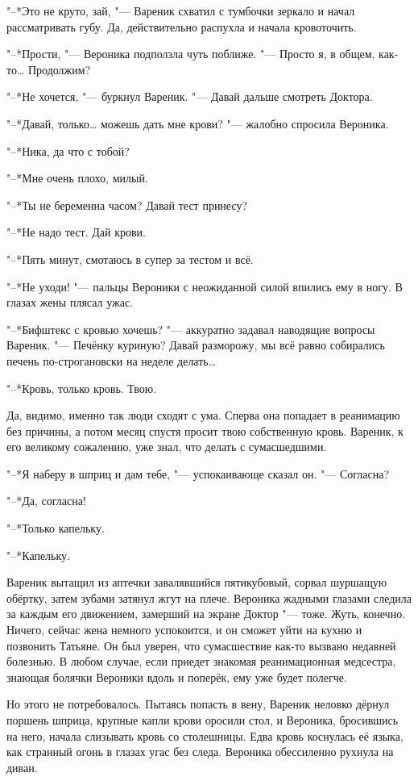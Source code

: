 "--*Это не круто, зай, "--- Вареник схватил с тумбочки зеркало и начал рассматривать губу.
Да, действительно распухла и начала кровоточить.

"--*Прости, "--- Вероника подползла чуть поближе.
"--- Просто я, в общем, как-то\dots{}
Продолжим?

"--*Не хочется, "--- буркнул Вареник.
"--- Давай дальше смотреть Доктора.

"--*Давай, только\dots{} можешь дать мне крови? "--- жалобно спросила Вероника.

"--*Ника, да что с тобой?

"--*Мне очень плохо, милый.

"--*Ты не беременна часом?
Давай тест принесу?

"--*Не надо тест.
Дай крови.

"--*Пять минут, смотаюсь в супер за тестом и всё.

"--*Не уходи! "--- пальцы Вероники с неожиданной силой впились ему в ногу.
В глазах жены плясал ужас.

"--*Бифштекс с кровью хочешь? "--- аккуратно задавал наводящие вопросы Вареник.
"--- Печёнку куриную?
Давай разморожу, мы всё равно собирались печень по-строгановски на неделе делать\dots{}

"--*Кровь, только кровь.
Твою.

Да, видимо, именно так люди сходят с ума.
Сперва она попадает в реанимацию без причины, а потом месяц спустя просит твою собственную кровь.
Вареник, к его великому сожалению, уже знал, что делать с сумасшедшими.

"--*Я наберу в шприц и дам тебе, "--- успокаивающе сказал он.
"--- Согласна?

"--*Да, согласна!

"--*Только капельку.

"--*Капельку.

Вареник вытащил из аптечки завалявшийся пятикубовый, сорвал шуршащую обёртку, затем зубами затянул жгут на плече.
Вероника жадными глазами следила за каждым его движением, замерший на экране Доктор "--- тоже.
Жуть, конечно.
Ничего, сейчас жена немного успокоится, и он сможет уйти на кухню и позвонить Татьяне.
Он был уверен, что сумасшествие как-то вызвано недавней болезнью.
В любом случае, если приедет знакомая реанимационная медсестра, знающая болячки Вероники вдоль и поперёк, ему уже будет полегче.

Но этого не потребовалось.
Пытаясь попасть в вену, Вареник неловко дёрнул поршень шприца, крупные капли крови оросили стол, и Вероника, бросившись на него, начала слизывать кровь со столешницы.
Едва кровь коснулась её языка, как странный огонь в глазах угас без следа.
Вероника обессиленно рухнула на диван.

